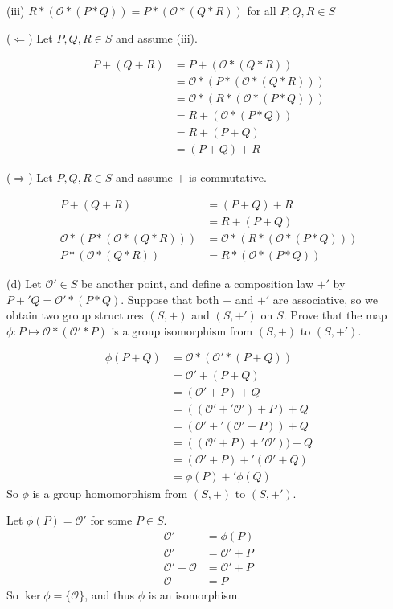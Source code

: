 \documentclass{article}
\begin{document}
(iii) $R*(\mathcal{O}*(P*Q)) = P*(\mathcal{O}*(Q*R))$ for all $P,Q,R \in S$

($\Leftarrow$) Let $P,Q,R \in S$ and assume (iii).

\begin{align*}
P + (Q + R) &= P + (\mathcal{O} * (Q * R)) \\
&= \mathcal{O} * (P * (\mathcal{O} * (Q * R))) \\
&= \mathcal{O} * (R * (\mathcal{O} * (P * Q))) \\
&= R + (\mathcal{O} * (P * Q)) \\
&= R + (P + Q) \\
&= (P + Q) + R
\end{align*}

($\Rightarrow$) Let $P,Q,R \in S$ and assume $+$ is commutative.

\begin{align*}
P + (Q + R) &= (P + Q) + R \\
&= R + (P + Q) \\
\mathcal{O} * (P * (\mathcal{O} * (Q * R))) &= \mathcal{O} * ( R * (\mathcal{O} * (P * Q))) \\
P * (\mathcal{O} * (Q * R)) &= R * (\mathcal{O} * (P * Q))
\end{align*}

(d) Let $\mathcal{O}' \in S$ be another point, and define a composition law $+'$ by $P +' Q = \mathcal{O}' * (P*Q)$. Suppose that both $+$ and $+'$ are associative, so we obtain two group structures $(S,+)$ and $(S,+')$ on $S$. Prove that the map $\phi: P \mapsto \mathcal{O}*(\mathcal{O}'*P)$ is a group isomorphism from $(S,+)$ to $(S,+')$.

\begin{align*}
\phi(P+Q) &= \mathcal{O} * (\mathcal{O}' * (P + Q)) \\
&= \mathcal{O}' + (P+Q) \\
&= (\mathcal{O}'+P)+Q \\
&= ((\mathcal{O}' +' \mathcal{O}')+P)+Q \\
&= (\mathcal{O}' +' (\mathcal{O}'+P))+Q \\
&= ((\mathcal{O}'+P) +' \mathcal{O}')) + Q \\
&= (\mathcal{O}'+P) +' (\mathcal{O}' + Q) \\
&= \phi(P) +' \phi(Q)
\end{align*}
So $\phi$ is a group homomorphism from $(S,+)$ to $(S,+')$.

Let $\phi(P) = \mathcal{O}'$ for some $P \in S$.
\begin{align*}
\mathcal{O}' &= \phi(P) \\
\mathcal{O}' &= \mathcal{O}' + P \\
\mathcal{O}' + \mathcal{O} &= \mathcal{O}' + P \\
\mathcal{O} &= P
\end{align*}
So $\ker\phi = \{\mathcal{O}\}$, and thus $\phi$ is an isomorphism.
\end{document}

